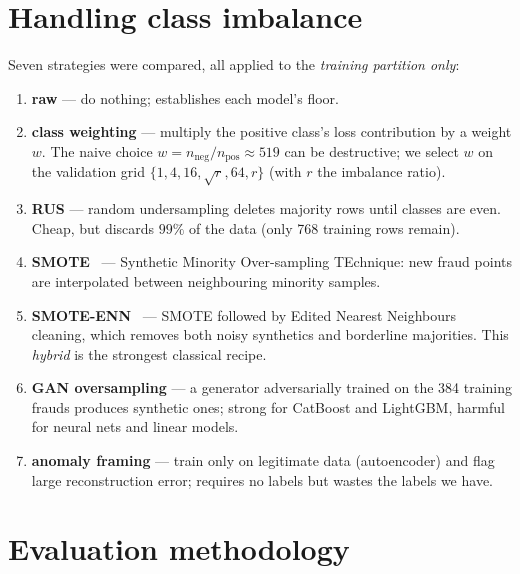 \documentclass[11pt,a4paper]{article}
\begin{document}
\section{Handling class imbalance}\label{sec:imbalance}

Seven strategies were compared, all applied to the \emph{training partition only}:

\begin{enumerate}[leftmargin=*]
      \item \textbf{raw} --- do nothing; establishes each model's floor.
      \item \textbf{class weighting} --- multiply the positive class's loss contribution by a
            weight $w$. The naive choice $w = n_{\text{neg}}/n_{\text{pos}} \approx 519$ can be
            destructive; we select $w$ on the validation grid
            $\{1, 4, 16, \sqrt{r}, 64, r\}$ (with $r$ the imbalance ratio).
      \item \textbf{RUS} --- random undersampling deletes majority rows until classes are even.
            Cheap, but discards $99\%$ of the data (only 768 training rows remain).
      \item \textbf{SMOTE}~\cite{chawla2002} --- Synthetic Minority Over-sampling TEchnique:
            new fraud points are interpolated between neighbouring minority samples.
      \item \textbf{SMOTE-ENN}~\cite{batista2004} --- SMOTE followed by Edited Nearest Neighbours
            cleaning, which removes both noisy synthetics and borderline majorities.
            This \emph{hybrid} is the strongest classical recipe.
      \item \textbf{GAN oversampling} --- a generator adversarially trained on the 384 training
            frauds produces synthetic ones; strong for CatBoost and LightGBM, harmful for
            neural nets and linear models.
      \item \textbf{anomaly framing} --- train only on legitimate data (autoencoder) and flag
            large reconstruction error; requires no labels but wastes the labels we have.
\end{enumerate}

\section{Evaluation methodology}\label{sec:protocol}
\end{document}
